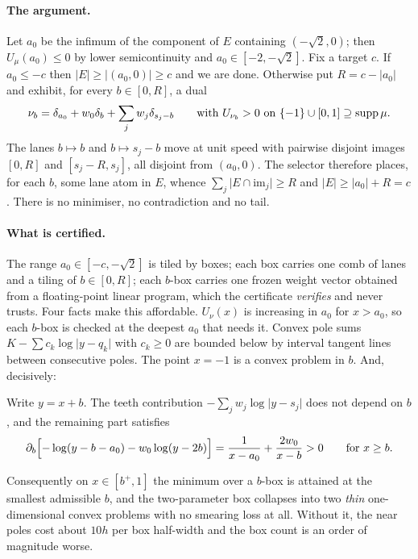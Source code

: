\documentclass[11pt]{article}
\begin{document}
\paragraph{The argument.} Let $a_0$ be the infimum of the component of
$E$ containing $(-\sqrt2,0)$; then $U_\mu(a_0)\le0$ by lower
semicontinuity and $a_0\in[-2,-\sqrt2]$. Fix a target $c$. If
$a_0\le -c$ then $\lvert E\rvert\ge\lvert(a_0,0)\rvert\ge c$ and we are
done. Otherwise put $R=c-\lvert a_0\rvert$ and exhibit, for every
$b\in[0,R]$, a dual
\[
  \nu_b=\delta_{a_0}+w_0\delta_b+\sum_j w_j\delta_{s_j-b}
  \qquad\text{with } U_{\nu_b}>0 \text{ on } \{-1\}\cup[0,1] \supseteq \operatorname{supp}\mu .
\]
The lanes $b\mapsto b$ and $b\mapsto s_j-b$ move at unit speed with
pairwise disjoint images $[0,R]$ and $[s_j-R,s_j]$, all disjoint from
$(a_0,0)$. The selector therefore places, for each $b$, some lane atom
in $E$, whence $\sum_j\lvert E\cap\mathrm{im}_j\rvert\ge R$ and
$\lvert E\rvert\ge\lvert a_0\rvert+R=c$. There is no minimiser, no
contradiction and no tail.

\paragraph{What is certified.} The range $a_0\in[-c,-\sqrt2]$ is tiled by
boxes; each box carries one comb of lanes and a tiling of $b\in[0,R]$;
each $b$-box carries one frozen weight vector obtained from a
floating-point linear program, which the certificate \emph{verifies} and
never trusts. Four facts make this affordable. $U_\nu(x)$ is increasing
in $a_0$ for $x>a_0$, so each $b$-box is checked at the deepest $a_0$
that needs it. Convex pole sums $K-\sum c_k\log\lvert y-q_k\rvert$ with
$c_k\ge0$ are bounded below by interval tangent lines between
consecutive poles. The point $x=-1$ is a convex problem in $b$. And,
decisively:

\begin{lemma}
Write $y=x+b$. The teeth contribution
$-\sum_j w_j\log\lvert y-s_j\rvert$ does not depend on $b$, and the
remaining part satisfies
\[
  \partial_b\Bigl[-\log(y-b-a_0)-w_0\log(y-2b)\Bigr]
  = \frac{1}{x-a_0}+\frac{2w_0}{x-b} > 0
  \qquad\text{for } x\ge b .
\]
\end{lemma}

Consequently on $x\in[b^+,1]$ the minimum over a $b$-box is attained at
the smallest admissible $b$, and the two-parameter box collapses into
two \emph{thin} one-dimensional convex problems with no smearing loss at
all. Without it, the near poles cost about $10h$ per box half-width and
the box count is an order of magnitude worse.
\end{document}
